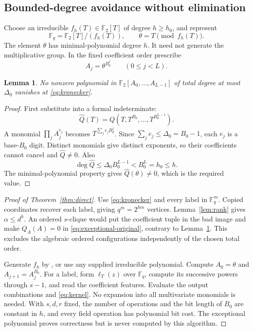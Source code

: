 \documentclass[11pt,a4paper]{article}
\newcommand{\F}{\mathbb F}
\newtheorem{lemma}[theorem]{Lemma}
\theoremstyle{definition}
\theoremstyle{remark}
\numberwithin{equation}{section}
\begin{document}
\subsection{Bounded-degree avoidance without elimination}
Choose an irreducible $f_h(T)\in\F_2[T]$ of degree $h\ge h_0$, and represent
\[
\F_q=\F_2[T]/(f_h(T)),\qquad\theta=T\pmod{f_h(T)}.
\]
The element $\theta$ has minimal-polynomial degree $h$. It need not generate the multiplicative group. In the fixed coefficient order prescribe
\begin{equation}\label{eq:kronecker}
A_j=\theta^{B_0^j}\qquad(0\le j<L).
\end{equation}

\begin{lemma}\label{lem:kronecker}
No nonzero polynomial in $\F_2[A_0,\ldots,A_{L-1}]$ of total degree at most $\Delta_0$ vanishes at \eqref{eq:kronecker}.
\end{lemma}

\begin{proof}
First substitute into a formal indeterminate:
\[
\widehat Q(T)=Q(T,T^{B_0},\ldots,T^{B_0^{L-1}}).
\]
A monomial $\prod_jA_j^{e_j}$ becomes $T^{\sum_je_jB_0^j}$. Since $\sum_je_j\le\Delta_0=B_0-1$, each $e_j$ is a base-$B_0$ digit. Distinct monomials give distinct exponents, so their coefficients cannot cancel and $\widehat Q\ne0$. Also
\[
\deg\widehat Q\le\Delta_0B_0^{L-1}<B_0^L=h_0\le h.
\]
The minimal-polynomial property gives $\widehat Q(\theta)\ne0$, which is the required value.
\end{proof}

\begin{proof}[Proof of Theorem~\ref{thm:direct}]
Use \eqref{eq:kronecker} and every label in $\F_q^m$. Copied coordinates recover each label, giving $q^m=2^{hm}$ vertices. Lemma~\ref{lem:rank} gives $\alpha\le d^h$. An ordered $s$-clique would put the coefficient tuple in the bad image and make $Q_A(A)=0$ in \eqref{eq:exceptional-original}, contrary to Lemma~\ref{lem:kronecker}. This excludes the algebraic ordered configurations independently of the chosen total order.

Generate $f_h$ by \cite{Shoup}, or use any supplied irreducible polynomial. Compute $A_0=\theta$ and $A_{j+1}=A_j^{B_0}$. For a label, form $\ell_T(z)$ over $\F_q$, compute its successive powers through $s-1$, and read the coefficient features. Evaluate the output combinations and \eqref{eq:kernel}. No expansion into all multivariate monomials is needed. With $s,d,r$ fixed, the number of operations and the bit length of $B_0$ are constant in $h$, and every field operation has polynomial bit cost. The exceptional polynomial proves correctness but is never computed by this algorithm.
\end{proof}
\end{document}
